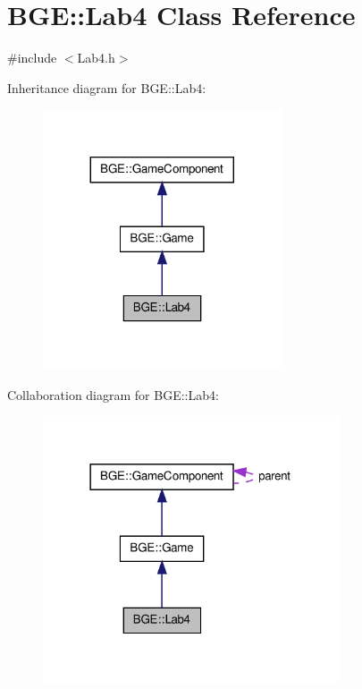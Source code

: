 \hypertarget{class_b_g_e_1_1_lab4}{\section{B\-G\-E\-:\-:Lab4 Class Reference}
\label{class_b_g_e_1_1_lab4}
}


{\ttfamily \#include $<$Lab4.\-h$>$}



Inheritance diagram for B\-G\-E\-:\-:Lab4\-:
\nopagebreak
\begin{figure}[H]
\begin{center}
\leavevmode
\includegraphics[width=200pt]{class_b_g_e_1_1_lab4__inherit__graph}
\end{center}
\end{figure}


Collaboration diagram for B\-G\-E\-:\-:Lab4\-:
\nopagebreak
\begin{figure}[H]
\begin{center}
\leavevmode
\includegraphics[width=249pt]{class_b_g_e_1_1_lab4__coll__graph}
\end{center}
\end{figure}
